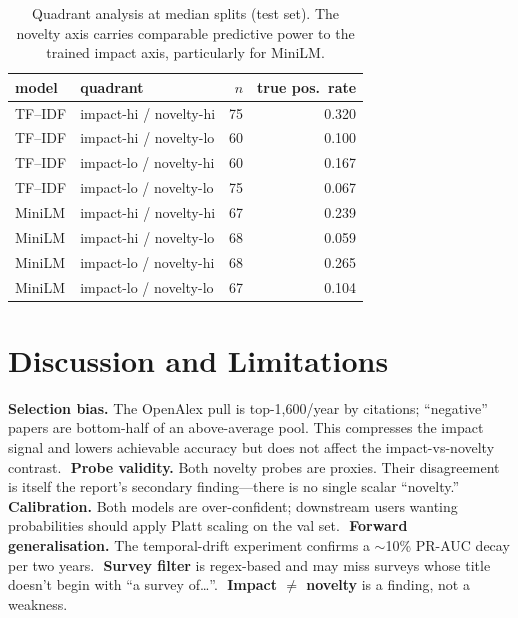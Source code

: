 \documentclass[conference]{IEEEtran}
\begin{document}
\begin{table}[h]\centering\small
\begin{tabular}{llrr}
\toprule
model & quadrant & $n$ & true pos.\ rate \\
\midrule
TF--IDF & impact-hi / novelty-hi & 75 & 0.320 \\
TF--IDF & impact-hi / novelty-lo & 60 & 0.100 \\
TF--IDF & impact-lo / novelty-hi & 60 & 0.167 \\
TF--IDF & impact-lo / novelty-lo & 75 & 0.067 \\
\midrule
MiniLM  & impact-hi / novelty-hi & 67 & 0.239 \\
MiniLM  & impact-hi / novelty-lo & 68 & 0.059 \\
MiniLM  & impact-lo / novelty-hi & 68 & 0.265 \\
MiniLM  & impact-lo / novelty-lo & 67 & 0.104 \\
\bottomrule
\end{tabular}
\caption{Quadrant analysis at median splits (test set). The novelty axis carries comparable predictive power to the trained impact axis, particularly for MiniLM.}
\label{tab:quad}
\end{table}

\section{Discussion and Limitations}
\textbf{Selection bias.} The OpenAlex pull is top-1{,}600/year by citations; ``negative'' papers are bottom-half of an above-average pool. This compresses the impact signal and lowers achievable accuracy but does not affect the impact-vs-novelty contrast.\,\,
\textbf{Probe validity.} Both novelty probes are proxies. Their disagreement is itself the report's secondary finding---there is no single scalar ``novelty.''\,\,
\textbf{Calibration.} Both models are over-confident; downstream users wanting probabilities should apply Platt scaling on the val set.\,\,
\textbf{Forward generalisation.} The temporal-drift experiment confirms a $\sim$10\% PR-AUC decay per two years.\,\,
\textbf{Survey filter} is regex-based and may miss surveys whose title doesn't begin with ``a survey of\dots''.\,\,
\textbf{Impact $\ne$ novelty} is a finding, not a weakness.
\end{document}
